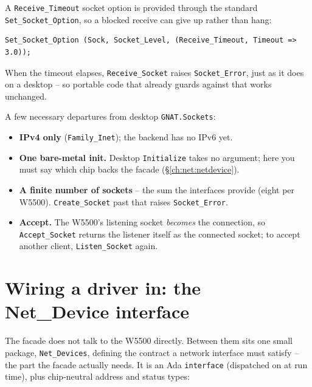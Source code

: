 A \texttt{Receive\_Timeout} socket option is provided through the standard
\texttt{Set\_Socket\_Option}, so a blocked receive can give up rather than hang:

\begin{lstlisting}
Set_Socket_Option (Sock, Socket_Level, (Receive_Timeout, Timeout => 3.0));
\end{lstlisting}

When the timeout elapses, \texttt{Receive\_Socket} raises \texttt{Socket\_Error},
just as it does on a desktop -- so portable code that already guards against that
works unchanged.

A few necessary departures from desktop \texttt{GNAT.Sockets}:

\begin{itemize}[nosep]
\item \textbf{IPv4 only} (\texttt{Family\_Inet}); the backend has no IPv6 yet.
\item \textbf{One bare-metal init.} Desktop \texttt{Initialize} takes no argument;
here you must say which chip backs the facade (\S\ref{ch:net:netdevice}).
\item \textbf{A finite number of sockets} -- the sum the interfaces provide (eight
per W5500). \texttt{Create\_Socket} past that raises \texttt{Socket\_Error}.
\item \textbf{Accept.} The W5500's listening socket \emph{becomes} the connection,
so \texttt{Accept\_Socket} returns the listener itself as the connected socket; to
accept another client, \texttt{Listen\_Socket} again.
\end{itemize}

\section{Wiring a driver in: the Net\_Device interface}
\label{ch:net:netdevice}

The facade does not talk to the W5500 directly. Between them sits one small
package, \texttt{Net\_Devices}, defining the contract a network interface must
satisfy -- the part the facade actually needs. It is an Ada \texttt{interface}
(dispatched on at run time), plus chip-neutral address and status types:

